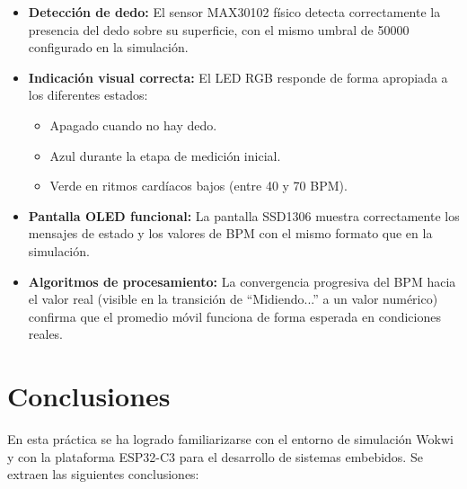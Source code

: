 \documentclass[11pt,a4paper]{article}
\begin{document}
\begin{itemize}
    \item \textbf{Detección de dedo:} El sensor MAX30102 físico detecta correctamente la presencia del dedo sobre su superficie, con el mismo umbral de 50000 configurado en la simulación.
    
    \item \textbf{Indicación visual correcta:} El LED RGB responde de forma apropiada a los diferentes estados:
    \begin{itemize}
        \item Apagado cuando no hay dedo.
        \item Azul durante la etapa de medición inicial.
        \item Verde en ritmos cardíacos bajos (entre 40 y 70 BPM).
    \end{itemize}
    
    \item \textbf{Pantalla OLED funcional:} La pantalla SSD1306 muestra correctamente los mensajes de estado y los valores de BPM con el mismo formato que en la simulación.
    
    \item \textbf{Algoritmos de procesamiento:} La convergencia progresiva del BPM hacia el valor real (visible en la transición de ``Midiendo...'' a un valor numérico) confirma que el promedio móvil funciona de forma esperada en condiciones reales.
\end{itemize}

\vspace{2cm}

\section{Conclusiones}

En esta práctica se ha logrado familiarizarse con el entorno de simulación Wokwi y con la plataforma ESP32-C3 para el desarrollo de sistemas embebidos. Se extraen las siguientes conclusiones:
\end{document}
